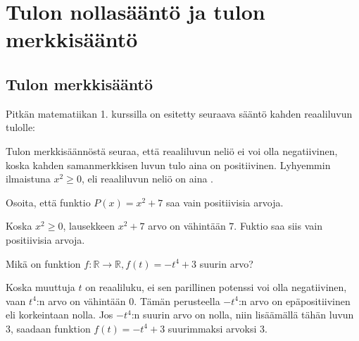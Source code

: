 \section{Tulon nollasääntö ja tulon merkkisääntö}

\subsection*{Tulon merkkisääntö}

Pitkän matematiikan 1. kurssilla on esitetty seuraava sääntö kahden reaaliluvun tulolle:


Tulon merkkisäännöstä seuraa, että reaaliluvun neliö ei voi olla negatiivinen, koska kahden samanmerkkisen luvun tulo aina on positiivinen. Lyhyemmin ilmaistuna $x^2 \geq 0$, eli reaaliluvun neliö on aina .

\begin{esimerkki}
Osoita, että funktio $P(x)=x^2+7$ saa vain positiivisia arvoja.
    \begin{esimratk}
	Koska $x^2 \geq 0$, lausekkeen $x^2+7$ arvo on vähintään $7$. Fuktio saa siis
	vain positiivisia arvoja.
    \end{esimratk}
\end{esimerkki}

\begin{esimerkki}
Mikä on funktion $f:\mathbb{R} \rightarrow \mathbb{R}, f(t)=-t^4+3$ suurin arvo?
    \begin{esimratk}
	Koska muuttuja $t$ on reaaliluku, ei sen parillinen potenssi voi olla negatiivinen, vaan $t^4$:n arvo on vähintään $0$. Tämän perusteella $-t^4$:n arvo on epäpositiivinen eli korkeintaan nolla. Jos $-t^4$:n suurin arvo on nolla, niin lisäämällä tähän luvun $3$, saadaan funktion $f(t)=-t^4+3$ suurimmaksi arvoksi $3$.
    \end{esimratk}
\end{esimerkki}


